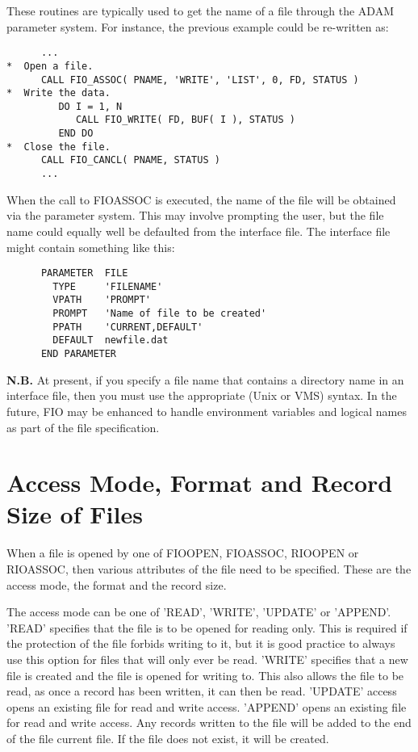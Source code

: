 \documentclass[twoside,11pt]{article}
\renewcommand{\_}{\texttt{\symbol{95}}}
\begin{document}
These routines are typically used to get the name of a file through the ADAM
parameter system. For instance, the previous example could be re-written as:

\begin{verbatim}
      ...
*  Open a file.
      CALL FIO_ASSOC( PNAME, 'WRITE', 'LIST', 0, FD, STATUS )
*  Write the data.
         DO I = 1, N
            CALL FIO_WRITE( FD, BUF( I ), STATUS )
         END DO
*  Close the file.
      CALL FIO_CANCL( PNAME, STATUS )
      ...
\end{verbatim}

When the call to FIO\_ASSOC is executed, the name of the file will be obtained
via the parameter system. This may involve prompting the user, but the file
name could equally well be defaulted from the interface file. The interface
file might contain something like this:

\begin{verbatim}
      PARAMETER  FILE
        TYPE     'FILENAME'
        VPATH    'PROMPT'
        PROMPT   'Name of file to be created'
        PPATH    'CURRENT,DEFAULT'
        DEFAULT  newfile.dat
      END PARAMETER
\end{verbatim}

{\bf N.B.} At present, if you specify a file name that contains a directory
name in an interface file, then you must use the appropriate (Unix or VMS)
syntax.
In the future, FIO may be enhanced to handle environment variables and
logical names as part of the file specification.

\section{Access Mode, Format and Record Size of Files}

When a file is opened by one of FIO\_OPEN, FIO\_ASSOC, RIO\_OPEN or
RIO\_ASSOC, then various attributes of the file need to be specified. These are
the access mode, the format and the record size.

The access mode can be one of 'READ', 'WRITE', 'UPDATE' or 'APPEND'. 'READ'
specifies that the file is to be opened for reading only. This is required if
the protection of the file forbids writing to it, but it is good practice to
always use this option for files that will only ever be read. 'WRITE' specifies
that a new file is created and the file is opened for writing to. This also
allows the file to be read, as once a record has been written, it can then be
read. 'UPDATE' access opens an existing file for read and write access.
'APPEND' opens an existing file for read and write access. Any records written
to the file will be added to the end of the file current file. If the file does
not exist, it will be created.
\end{document}
